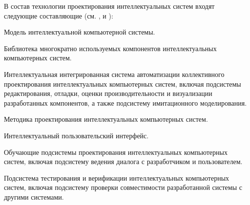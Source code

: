 \begin{partbacktext}
В состав технологии проектирования интеллектуальных систем входят следующие составляющие (см. ,  и ):
\begin{textitemize}
	\item Модель интеллектуальной компьютерной системы.
	\item Библиотека многократно используемых компонентов интеллектуальных компьютерных систем.
	\item Интеллектуальная интегрированная система автоматизации коллективного проектирования интеллектуальных компьютерных систем, включая подсистемы редактирования, отладки, оценки производительности и визуализации разработанных компонентов, а также подсистему имитационного моделирования.
	\item Методика проектирования интеллектуальных компьютерных систем.
	\item Интеллектуальный пользовательский интерфейс.
	\item Обучающие подсистемы проектирования интеллектуальных компьютерных систем, включая подсистему ведения диалога с разработчиком и пользователем.
	\item Подсистема тестирования и верификации интеллектуальных компьютерных систем, включая подсистему проверки совместимости разработанной системы с другими системами.
\end{textitemize}

\end{partbacktext}





